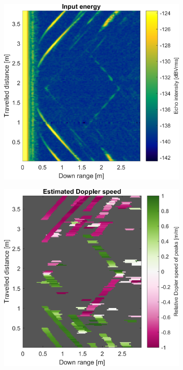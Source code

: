 \begin{figure}[htbp]
    \centering
    \begin{subfigure}[t]{0.475\linewidth}
        \centering
        \includegraphics[width=\linewidth,max height=.475\textheight]{gfx/results/jailcell_input.png}
    \end{subfigure}%
    \hfill%
    \begin{subfigure}[t]{0.475\linewidth}
        \centering
        \includegraphics[width=\linewidth,max height=.475\textheight]{gfx/results/jailcell_doppler.png}

\end{subfigure}
\end{figure}
